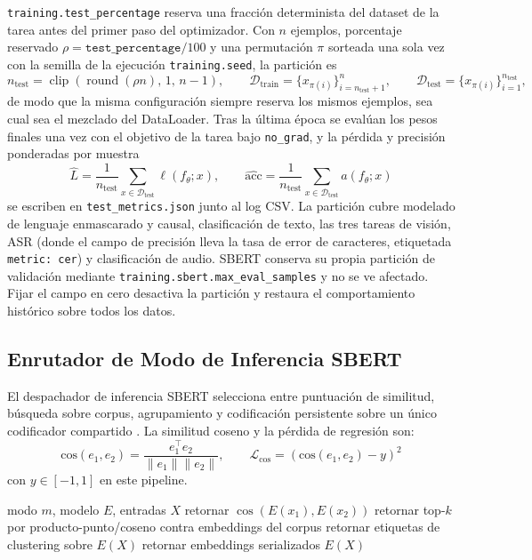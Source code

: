 \texttt{training.test\_percentage} reserva una fracción determinista del dataset de la tarea antes del primer paso del optimizador. Con $n$ ejemplos, porcentaje reservado $\rho=\texttt{test\_percentage}/100$ y una permutación $\pi$ sorteada una sola vez con la semilla de la ejecución \texttt{training.seed}, la partición es
\[
n_{\text{test}}=\operatorname{clip}\!\left(\operatorname{round}(\rho n),\,1,\,n-1\right),\qquad
\mathcal{D}_{\text{train}}=\{x_{\pi(i)}\}_{i=n_{\text{test}}+1}^{n},\qquad
\mathcal{D}_{\text{test}}=\{x_{\pi(i)}\}_{i=1}^{n_{\text{test}}} ,
\]
de modo que la misma configuración siempre reserva los mismos ejemplos, sea cual sea el mezclado del DataLoader. Tras la última época se evalúan los pesos finales una vez con el objetivo de la tarea bajo \texttt{no\_grad}, y la pérdida y precisión ponderadas por muestra
\[
\hat{L}=\frac{1}{n_{\text{test}}}\sum_{x\in\mathcal{D}_{\text{test}}}\ell(f_\theta;x),\qquad
\widehat{\text{acc}}=\frac{1}{n_{\text{test}}}\sum_{x\in\mathcal{D}_{\text{test}}}a(f_\theta;x)
\]
se escriben en \texttt{test\_metrics.json} junto al log CSV. La partición cubre modelado de lenguaje enmascarado y causal, clasificación de texto, las tres tareas de visión, ASR (donde el campo de precisión lleva la tasa de error de caracteres, etiquetada \texttt{metric: cer}) y clasificación de audio. SBERT conserva su propia partición de validación mediante \texttt{training.sbert.max\_eval\_samples} y no se ve afectado. Fijar el campo en cero desactiva la partición y restaura el comportamiento histórico sobre todos los datos.

\subsection{Enrutador de Modo de Inferencia SBERT}

El despachador de inferencia SBERT selecciona entre puntuación de similitud, búsqueda sobre corpus, agrupamiento y codificación persistente sobre un único codificador compartido \citep{reimers_sentence-bert_2019}. La similitud coseno y la pérdida de regresión son:
\[
\text{cos}(e_1,e_2)=\frac{e_1^\top e_2}{\|e_1\|\|e_2\|},\qquad
\mathcal{L}_{\text{cos}}=\left(\text{cos}(e_1,e_2)-y\right)^2
\]
con $y\in[-1,1]$ en este pipeline.

\begin{algorithm}[t]
\caption{Enrutador de Modo de Inferencia SBERT}
\begin{algorithmic}[1]
\Require modo $m$, modelo $E$, entradas $X$
    \State retornar $\cos(E(x_1),E(x_2))$
    \State retornar top-$k$ por producto-punto/coseno contra embeddings del corpus
    \State retornar etiquetas de clustering sobre $E(X)$
\Else
    \State retornar embeddings serializados $E(X)$
\EndIf
\end{algorithmic}
\end{algorithm}